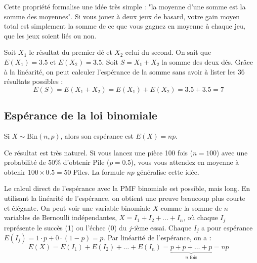 \begin{intuitionbox}
Cette propriété formalise une idée très simple : "la moyenne d'une somme est la somme des moyennes". Si vous jouez à deux jeux de hasard, votre gain moyen total est simplement la somme de ce que vous gagnez en moyenne à chaque jeu, que les jeux soient liés ou non.
\end{intuitionbox}

\begin{examplebox}
Soit $X_1$ le résultat du premier dé et $X_2$ celui du second. On sait que $E(X_1) = 3.5$ et $E(X_2) = 3.5$.
Soit $S = X_1 + X_2$ la somme des deux dés. Grâce à la linéarité, on peut calculer l'espérance de la somme sans avoir à lister les 36 résultats possibles :
$$ E(S) = E(X_1 + X_2) = E(X_1) + E(X_2) = 3.5 + 3.5 = 7 $$
\end{examplebox}

\subsection{Espérance de la loi binomiale}

\begin{theorembox}
Si $X \sim \text{Bin}(n, p)$, alors son espérance est $E(X) = np$.
\end{theorembox}

\begin{intuitionbox}
Ce résultat est très naturel. Si vous lancez une pièce 100 fois ($n=100$) avec une probabilité de 50\% d'obtenir Pile ($p=0.5$), vous vous attendez en moyenne à obtenir $100 \times 0.5 = 50$ Piles. La formule $np$ généralise cette idée.
\end{intuitionbox}

\begin{proofbox}
Le calcul direct de l'espérance avec la PMF binomiale est possible, mais long. En utilisant la linéarité de l'espérance, on obtient une preuve beaucoup plus courte et élégante.
\newline
On peut voir une variable binomiale $X$ comme la somme de $n$ variables de Bernoulli indépendantes, $X = I_1 + I_2 + \dots + I_n$, où chaque $I_j$ représente le succès (1) ou l'échec (0) du $j$-ième essai.
\newline
Chaque $I_j$ a pour espérance $E(I_j) = 1 \cdot p + 0 \cdot (1-p) = p$.
\newline
Par linéarité de l'espérance, on a :
$$ E(X) = E(I_1) + E(I_2) + \dots + E(I_n) = \underbrace{p + p + \dots + p}_{n \text{ fois}} = np $$
\end{proofbox}

